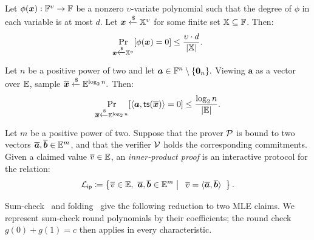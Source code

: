 \begin{lemma}
\label{lemma:schwartz}
Let
\( \phi(\bm{x}) : {\mathbb{F}}^\upsilon \to {\mathbb{F}} \) be a nonzero \( \upsilon \)-variate polynomial such that the degree of \( \phi \) in each variable is at most \( d \). Let \( \bm{x} \mathrel{\xleftarrow{\$}} \mathbb{X}^{\upsilon} \) for some finite set \( \mathbb{X} \subseteq {\mathbb{F}} \). Then:
\[
    \Pr_{\bm{x} \mathrel{\xleftarrow{\$}} \mathbb{X}^{\upsilon}}\!\left[ \phi(\bm{x}) = 0 \right]
    \le \frac{\upsilon \cdot d}{|\mathbb{X}|}.
\]
\end{lemma}

\begin{corollary}
\label{corollary:schwartz}
Let \(n\) be a positive power of two and let
\(
    \bm a\in{\mathbb{F}}^n\setminus\{\bm 0_n\}.
\)
Viewing \(\bm a\) as a vector over \(\mathbb{E}\), sample
\(
    \overline{\bm x}
    \mathrel{\xleftarrow{\$}}
    \mathbb{E}^{\log_2 n}.
\)
Then:
\[
    \Pr_{\overline{\bm x}\mathrel{\xleftarrow{\$}}
        \mathbb{E}^{\log_2 n}}
    \!\left[
        \left\langle
            \bm a,
            {\sf ts}(\overline{\bm x})
        \right\rangle
        =0
    \right]
    \leq
    \frac{\log_2 n}{\lvert\mathbb{E}\rvert}.
\]
\end{corollary}

\begin{definition}
\label{def:ip}
Let \(m\) be a positive power of two. Suppose that the prover
\(\mathcal{P}\) is bound to two vectors
\(\overline{\bm a},\overline{\bm b}\in\mathbb{E}^m\), and that the
verifier \(\mathcal{V}\) holds the corresponding commitments.
Given a claimed value \(\overline{v}\in\mathbb{E}\), an
\emph{inner-product proof} is an interactive protocol for the
relation:
\[
    \mathcal{L}_{\mathsf{ip}}
    \coloneqq
    \left\{
        \overline{v}\in \mathbb{E},~      \overline{\bm a},\overline{\bm b}\in\mathbb{E}^m
        \;\middle|\;
        \begin{array}{l}
            \overline{v}
            =\langle\overline{\bm a},\overline{\bm b}\rangle
        \end{array}
    \right\}.
\]
\end{definition}

Sum-check~\cite{crypto/Thaler13} and folding~\cite{asiacrypt/CCYY25}
give the following reduction to two MLE claims. We represent
sum-check round polynomials by their coefficients; the round check
\(g(0)+g(1)=c\) then applies in every characteristic.

